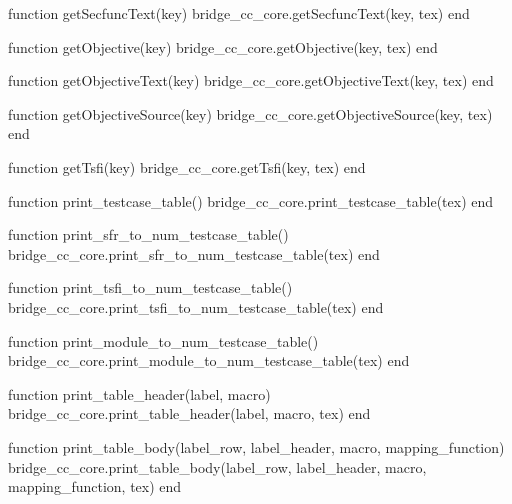 \begin{luacode}
  function getSecfuncText(key)
    bridge_cc_core.getSecfuncText(key, tex)
  end

  function getObjective(key)
    bridge_cc_core.getObjective(key, tex)
  end

  function getObjectiveText(key)
    bridge_cc_core.getObjectiveText(key, tex)
  end

  function getObjectiveSource(key)
    bridge_cc_core.getObjectiveSource(key, tex)
  end

  function getTsfi(key)
    bridge_cc_core.getTsfi(key, tex)
  end

  function print_testcase_table()
    bridge_cc_core.print_testcase_table(tex)
  end

  function print_sfr_to_num_testcase_table()
    bridge_cc_core.print_sfr_to_num_testcase_table(tex)
  end

  function print_tsfi_to_num_testcase_table()
    bridge_cc_core.print_tsfi_to_num_testcase_table(tex)
  end

  function print_module_to_num_testcase_table()
    bridge_cc_core.print_module_to_num_testcase_table(tex)
  end

  function print_table_header(label, macro)
    bridge_cc_core.print_table_header(label, macro, tex)
  end

  function print_table_body(label_row, label_header, macro, mapping_function)
    bridge_cc_core.print_table_body(label_row, label_header, macro, mapping_function, tex)
  end

\end{luacode}
